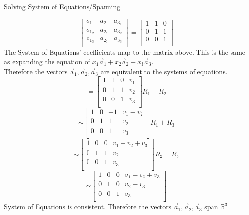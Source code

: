 \documentclass[12pt]{article}
\newcommand{\sqbrl}{\left[}
\newcommand{\sqbrr}{\right]}
\newenvironment{problem}[2][Problem]{\begin{trivlist}
\item[\hskip \labelsep {\bfseries #1}\hskip \labelsep {\bfseries #2.}]}{\end{trivlist}}
\begin{document}
\begin{problem}{6}
	Solving System of Equations/Spanning
\end{problem}
	\[\sqbrl\begin{matrix}
		a_{1_1} & a_{2_1} & a_{3_1}\\
		a_{1_2} & a_{2_2} & a_{3_2}\\
		a_{1_3} & a_{2_3} & a_{3_3}\\
	\end{matrix}\sqbrr
	= \sqbrl\begin{matrix}
		1 & 1 & 0\\
		0 & 1 & 1\\
		0 & 0 & 1\\
		\end{matrix}\sqbrr		
	\]
The System of Equations' coefficients map to the matrix above. This is the same as expanding the equation of 
$x_1 \vec{a}_1 + x_2 \vec{a}_2 + x_3 \vec{a}_3$.\\
Therefore the vectors $\vec a_1,  \vec a_2,  \vec a_3$ are equivalent to the systems of equations.\\
	\[=
		\left[
		\begin{array}{ccc|c}
		1 & 1 & 0 & v_1\\
		0 & 1 & 1 & v_2\\
		0 & 0 & 1 & v_3\\
		\end{array}
		\right] R_1 - R_2
	\]
	\[\sim
		\left[
		\begin{array}{ccc|c}
		1 & 0 & -1 & v_1 - v_2\\
		0 & 1 & 1 & v_2\\
		0 & 0 & 1 & v_3\\
		\end{array}
		\right] R_1 + R_3
	\]
	\[\sim
		\left[
		\begin{array}{ccc|c}
		1 & 0 & 0 & v_1 - v_2 + v_3\\
		0 & 1 & 1 & v_2\\
		0 & 0 & 1 & v_3\\
		\end{array}
		\right] R_2 - R_3
	\]
	\[\sim
		\left[
		\begin{array}{ccc|c}
		1 & 0 & 0 & v_1 - v_2 + v_3\\
		0 & 1 & 0 & v_2 - v_3\\
		0 & 0 & 1 & v_3\\
		\end{array}
		\right]
	\]
System of Equations is consistent. Therefore the vectors $\vec a_1,  \vec a_2,  \vec a_3$ span $\mathds{R}^3$
\end{document}
